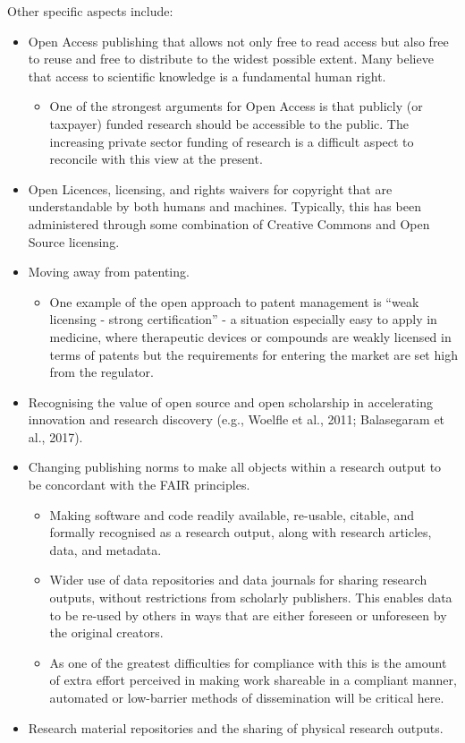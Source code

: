 \documentclass[]{article}
\providecommand{\tightlist}{%
  \setlength{\itemsep}{0pt}\setlength{\parskip}{0pt}}
\begin{document}
Other specific aspects include:

\begin{itemize}
\item
  Open Access publishing that allows not only free to read access but
  also free to reuse and free to distribute to the widest possible
  extent. Many believe that access to scientific knowledge is a
  fundamental human right.

  \begin{itemize}
  \tightlist
  \item
    One of the strongest arguments for Open Access is that publicly (or
    taxpayer) funded research should be accessible to the public. The
    increasing private sector funding of research is a difficult aspect
    to reconcile with this view at the present.
  \end{itemize}
\item
  Open Licences, licensing, and rights waivers for copyright that are
  understandable by both humans and machines. Typically, this has been
  administered through some combination of Creative Commons and Open
  Source licensing.
\item
  Moving away from patenting.

  \begin{itemize}
  \tightlist
  \item
    One example of the open approach to patent management is ``weak
    licensing - strong certification'' - a situation especially easy to
    apply in medicine, where therapeutic devices or compounds are weakly
    licensed in terms of patents but the requirements for entering the
    market are set high from the regulator.
  \end{itemize}
\item
  Recognising the value of open source and open scholarship in
  accelerating innovation and research discovery (e.g., Woelfle et al.,
  2011; Balasegaram et al., 2017).
\item
  Changing publishing norms to make all objects within a research output
  to be concordant with the FAIR principles.

  \begin{itemize}
  \item
    Making software and code readily available, re-usable, citable, and
    formally recognised as a research output, along with research
    articles, data, and metadata.
  \item
    Wider use of data repositories and data journals for sharing
    research outputs, without restrictions from scholarly publishers.
    This enables data to be re-used by others in ways that are either
    foreseen or unforeseen by the original creators.
  \item
    As one of the greatest difficulties for compliance with this is the
    amount of extra effort perceived in making work shareable in a
    compliant manner, automated or low-barrier methods of dissemination
    will be critical here.
  \end{itemize}
\item
  Research material repositories and the sharing of physical research
  outputs.


\end{itemize}
\end{document}
